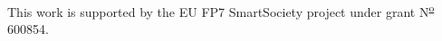 \documentclass{llncs}
\begin{document}
This work is supported by the EU FP7 SmartSociety project under grant N\textsuperscript{\underline{o}} 600854.



%
%
%
\end{document}

